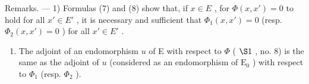 Remarks. --- 1) Formulas (7) and (8) show that, if \(x \in E\) , for \(\Phi(x, x') = 0\) to hold for all \(x' \in E'\) , it is necessary and sufficient that \(\Phi_1(x, x') = 0\) (resp. \(\Phi_2(x, x') = 0\) ) for all \(x' \in E'\) .

\begin{enumerate}
\def\labelenumi{\arabic{enumi})}
\setcounter{enumi}{1}
\tightlist
\item
  The adjoint of an endomorphism \(u\) of E with respect to \(\Phi\) ( \(\S 1\) , no. 8) is the same as the adjoint of \(u\) (considered as an endomorphism of \(\mathrm{E}_{0}\) ) with respect to \(\Phi_{1}\) (resp. \(\Phi_{2}\) ).
\end{enumerate}

